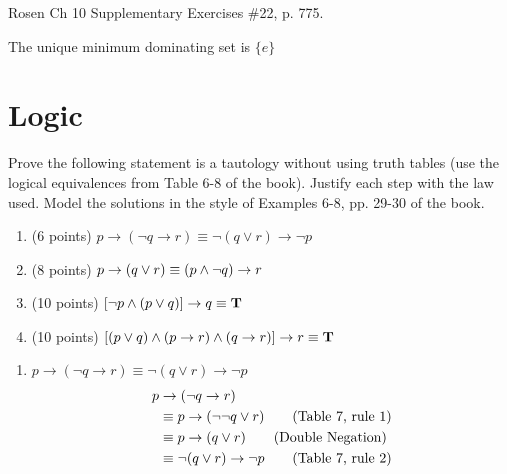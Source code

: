 \begin{questions}
  \ifprintanswers
        \vspace{-10pt}
  \fi
{} Rosen Ch 10 Supplementary Exercises \#22, p. 775.
  \ifprintanswers
        \vspace{-10pt}
  \fi
  \begin{solution}
    The unique minimum dominating set is $\{e \}$
  \end{solution}



\section*{Logic}
\ifprintanswers
\vspace{-10pt}
\fi


 Prove the following statement is a tautology without using truth tables (use the logical equivalences from Table 6-8 of the book).  Justify each step with the law used.  Model the solutions in the style of Examples 6-8, pp. 29-30 of the book.


\begin{enumerate}[label=(\alph*),itemsep=0pt,parsep=0pt,
topsep=0pt,partopsep=0pt]
    \item (6 points) $p \rightarrow (\neg q \rightarrow r) \equiv \neg(q \vee r)
    \rightarrow \neg p$

    \item (8 points) $p \rightarrow (q \vee r) \equiv (p \wedge \neg q) \rightarrow r$

    \item (10 points) $ [ \neg p \wedge (p \vee q) ] \rightarrow q \equiv \mathbf{T}$
    
    \item (10 points) $[(p \vee q) \wedge (p \rightarrow r) \wedge (q \rightarrow r)] \rightarrow r \equiv \mathbf{T}$
\end{enumerate}
\begin{solution}
  \begin{enumerate}[label=(\alph*),itemsep=0pt,parsep=0pt,
topsep=0pt,partopsep=0pt]
    \item $p \rightarrow (\neg q \rightarrow r) \equiv 
      \neg(q \vee r) \rightarrow \neg p$
    \begin{align*}
      p & \rightarrow (\neg q \rightarrow r) \\
      & \equiv p \rightarrow (\neg \neg q \vee r) \tag{Table 7, rule 1} \\
      & \equiv p \rightarrow (q \vee r) \tag{Double Negation} \\
      & \equiv \neg (q \vee r) \rightarrow \neg p \tag{Table 7, rule 2} \\
    \end{align*}


\end{enumerate}
\end{solution}
\end{questions}

